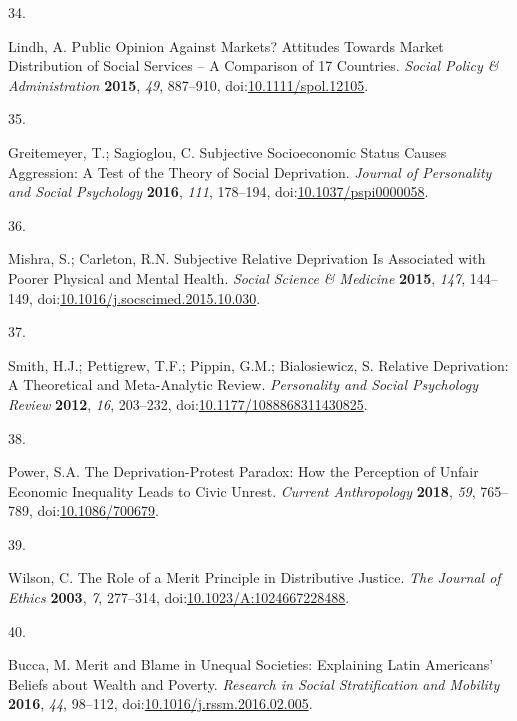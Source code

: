 \documentclass[
  12pt,
  letterpaper,
]{article}
\newlength{\cslhangindent}
\newlength{\csllabelwidth}
\newenvironment{CSLReferences}[2] %
 {\begin{list}{}{%
  \setlength{\itemindent}{0pt}
  \setlength{\leftmargin}{0pt}
  \setlength{\parsep}{0pt}
  \ifodd #1
   \setlength{\leftmargin}{\cslhangindent}
   \setlength{\itemindent}{-1\cslhangindent}
  \fi
  \setlength{\itemsep}{#2\baselineskip}}}
 {\end{list}}
\newcommand{\CSLLeftMargin}[1]{\parbox[t]{\csllabelwidth}{\strut#1\strut}}
\newcommand{\CSLRightInline}[1]{\parbox[t]{\linewidth - \csllabelwidth}{\strut#1\strut}}
\begin{document}
\begin{CSLReferences}{0}{0}
\CSLLeftMargin{34. }%
\CSLRightInline{Lindh, A. Public {Opinion} Against {Markets}?
{Attitudes} Towards {Market Distribution} of {Social Services} -- {A
Comparison} of 17 {Countries}. \emph{Social Policy \& Administration}
\textbf{2015}, \emph{49}, 887--910,
doi:\href{https://doi.org/10.1111/spol.12105}{10.1111/spol.12105}.}

\CSLLeftMargin{35. }%
\CSLRightInline{Greitemeyer, T.; Sagioglou, C. Subjective Socioeconomic
Status Causes Aggression: {A} Test of the Theory of Social Deprivation.
\emph{Journal of Personality and Social Psychology} \textbf{2016},
\emph{111}, 178--194,
doi:\href{https://doi.org/10.1037/pspi0000058}{10.1037/pspi0000058}.}

\CSLLeftMargin{36. }%
\CSLRightInline{Mishra, S.; Carleton, R.N. Subjective Relative
Deprivation Is Associated with Poorer Physical and Mental Health.
\emph{Social Science \& Medicine} \textbf{2015}, \emph{147}, 144--149,
doi:\href{https://doi.org/10.1016/j.socscimed.2015.10.030}{10.1016/j.socscimed.2015.10.030}.}

\CSLLeftMargin{37. }%
\CSLRightInline{Smith, H.J.; Pettigrew, T.F.; Pippin, G.M.;
Bialosiewicz, S. Relative {Deprivation}: {A Theoretical} and
{Meta-Analytic Review}. \emph{Personality and Social Psychology Review}
\textbf{2012}, \emph{16}, 203--232,
doi:\href{https://doi.org/10.1177/1088868311430825}{10.1177/1088868311430825}.}

\CSLLeftMargin{38. }%
\CSLRightInline{Power, S.A. The {Deprivation-Protest Paradox}: {How} the
{Perception} of {Unfair Economic Inequality Leads} to {Civic Unrest}.
\emph{Current Anthropology} \textbf{2018}, \emph{59}, 765--789,
doi:\href{https://doi.org/10.1086/700679}{10.1086/700679}.}

\CSLLeftMargin{39. }%
\CSLRightInline{Wilson, C. The {Role} of a {Merit Principle} in
{Distributive Justice}. \emph{The Journal of Ethics} \textbf{2003},
\emph{7}, 277--314,
doi:\href{https://doi.org/10.1023/A:1024667228488}{10.1023/A:1024667228488}.}

\CSLLeftMargin{40. }%
\CSLRightInline{Bucca, M. Merit and Blame in Unequal Societies:
{Explaining Latin Americans}' Beliefs about Wealth and Poverty.
\emph{Research in Social Stratification and Mobility} \textbf{2016},
\emph{44}, 98--112,
doi:\href{https://doi.org/10.1016/j.rssm.2016.02.005}{10.1016/j.rssm.2016.02.005}.}


\end{CSLReferences}
\end{document}
